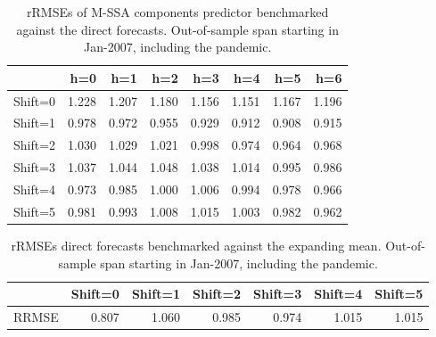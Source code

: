 \documentclass[a4paper]{article}
\begin{document}
\begin{table}[ht]
\centering
\begin{tabular}{rrrrrrrr}
  \hline
 & h=0 & h=1 & h=2 & h=3 & h=4 & h=5 & h=6 \\ 
  \hline
Shift=0 & 1.228 & 1.207 & 1.180 & 1.156 & 1.151 & 1.167 & 1.196 \\ 
  Shift=1 & 0.978 & 0.972 & 0.955 & 0.929 & 0.912 & 0.908 & 0.915 \\ 
  Shift=2 & 1.030 & 1.029 & 1.021 & 0.998 & 0.974 & 0.964 & 0.968 \\ 
  Shift=3 & 1.037 & 1.044 & 1.048 & 1.038 & 1.014 & 0.995 & 0.986 \\ 
  Shift=4 & 0.973 & 0.985 & 1.000 & 1.006 & 0.994 & 0.978 & 0.966 \\ 
  Shift=5 & 0.981 & 0.993 & 1.008 & 1.015 & 1.003 & 0.982 & 0.962 \\ 
   \hline
\end{tabular}
\caption{rRMSEs of M-SSA components predictor benchmarked against the direct forecasts. Out-of-sample span starting in Jan-2007, including the pandemic.} 
\label{rRMSE_mSSA_comp_direct3}
\end{table}%
\begin{table}[ht]
\centering
\begin{tabular}{rrrrrrr}
  \hline
 & Shift=0 & Shift=1 & Shift=2 & Shift=3 & Shift=4 & Shift=5 \\ 
  \hline
RRMSE & 0.807 & 1.060 & 0.985 & 0.974 & 1.015 & 1.015 \\ 
   \hline
\end{tabular}
\caption{rRMSEs direct forecasts benchmarked against the expanding mean. Out-of-sample span starting in Jan-2007, including the pandemic.} 
\label{rRMSE_mSSA_direct_mean4}
\end{table}
\end{document}
